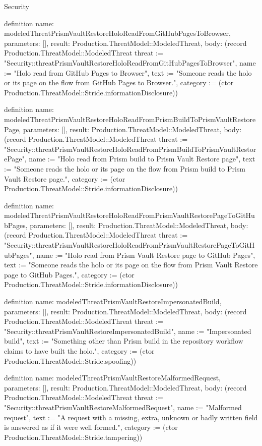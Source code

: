 \begin{lexlean}{Security}
\begin{semanticmodule}
definition{
  name: modeledThreatPrismVaultRestoreHoloReadFromGitHubPagesToBrowser,
  parameters: [],
  result: Production.ThreatModel::ModeledThreat,
  body: (record Production.ThreatModel::ModeledThreat {threat := "Security::threatPrismVaultRestoreHoloReadFromGitHubPagesToBrowser", name := "Holo read from GitHub Pages to Browser", text := "Someone reads the holo or its page on the flow from GitHub Pages to Browser.", category := (ctor Production.ThreatModel::Stride.informationDisclosure)})
}

definition{
  name: modeledThreatPrismVaultRestoreHoloReadFromPrismBuildToPrismVaultRestorePage,
  parameters: [],
  result: Production.ThreatModel::ModeledThreat,
  body: (record Production.ThreatModel::ModeledThreat {threat := "Security::threatPrismVaultRestoreHoloReadFromPrismBuildToPrismVaultRestorePage", name := "Holo read from Prism build to Prism Vault Restore page", text := "Someone reads the holo or its page on the flow from Prism build to Prism Vault Restore page.", category := (ctor Production.ThreatModel::Stride.informationDisclosure)})
}

definition{
  name: modeledThreatPrismVaultRestoreHoloReadFromPrismVaultRestorePageToGitHubPages,
  parameters: [],
  result: Production.ThreatModel::ModeledThreat,
  body: (record Production.ThreatModel::ModeledThreat {threat := "Security::threatPrismVaultRestoreHoloReadFromPrismVaultRestorePageToGitHubPages", name := "Holo read from Prism Vault Restore page to GitHub Pages", text := "Someone reads the holo or its page on the flow from Prism Vault Restore page to GitHub Pages.", category := (ctor Production.ThreatModel::Stride.informationDisclosure)})
}

definition{
  name: modeledThreatPrismVaultRestoreImpersonatedBuild,
  parameters: [],
  result: Production.ThreatModel::ModeledThreat,
  body: (record Production.ThreatModel::ModeledThreat {threat := "Security::threatPrismVaultRestoreImpersonatedBuild", name := "Impersonated build", text := "Something other than Prism build in the repository workflow claims to have built the holo.", category := (ctor Production.ThreatModel::Stride.spoofing)})
}

definition{
  name: modeledThreatPrismVaultRestoreMalformedRequest,
  parameters: [],
  result: Production.ThreatModel::ModeledThreat,
  body: (record Production.ThreatModel::ModeledThreat {threat := "Security::threatPrismVaultRestoreMalformedRequest", name := "Malformed request", text := "A request with a missing, extra, unknown or badly written field is answered as if it were well formed.", category := (ctor Production.ThreatModel::Stride.tampering)})
}


\end{semanticmodule}
\end{lexlean}
